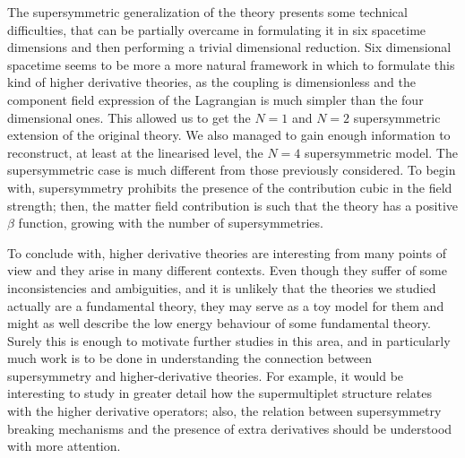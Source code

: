 The supersymmetric generalization of the theory presents some technical difficulties, that can be partially overcame in formulating it in six spacetime dimensions and then performing a trivial dimensional reduction.  Six dimensional spacetime seems to be more a more natural framework in which to formulate this kind of higher derivative theories, as the coupling is dimensionless and the component field expression of the Lagrangian is much simpler than the four dimensional ones. This allowed us to get the $N=1$ and $N=2$ supersymmetric extension of the original theory. We also managed to gain enough information to reconstruct, at least at the linearised level, the $N=4$ supersymmetric model. The supersymmetric case is much different from those previously considered. To begin with, supersymmetry prohibits the presence of the contribution cubic in the field strength; then, the matter field contribution is such that the theory has a positive $\beta$ function, growing with the number of supersymmetries.



To conclude with, higher derivative theories are interesting from many points of view and they arise in many different contexts. Even though they suffer of some inconsistencies and ambiguities, and it is unlikely that the theories we studied actually are a fundamental theory, they may serve as a toy model for them and might as well describe the low energy behaviour of some fundamental theory. Surely this is enough to motivate further studies in this area, and in particularly much work is to be done in understanding the connection between supersymmetry and higher-derivative theories. For example, it would be interesting to study in greater detail how the supermultiplet structure relates with the higher derivative operators; also, the relation between supersymmetry breaking mechanisms and the presence of extra derivatives should be understood with more attention. 










